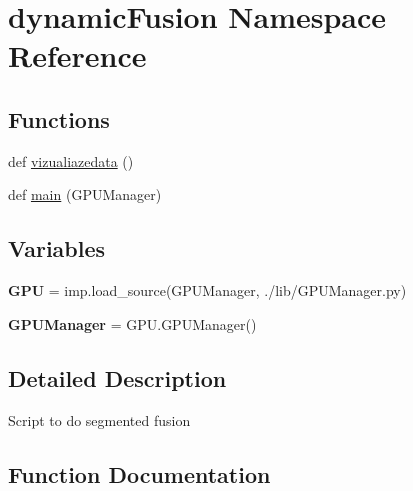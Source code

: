 \hypertarget{namespacedynamic_fusion}{}\section{dynamic\+Fusion Namespace Reference}
\label{namespacedynamic_fusion}
\subsection*{Functions}
\begin{DoxyCompactItemize}
\item 
def \hyperlink{namespacedynamic_fusion_a10b565077b2ce16f2ca380fb8b634fa1}{vizualiazedata} ()
\item 
def \hyperlink{namespacedynamic_fusion_a6ead22a2201158e6101fd1b1e89f3c27}{main} (G\+P\+U\+Manager)
\end{DoxyCompactItemize}
\subsection*{Variables}
\begin{DoxyCompactItemize}
\item 
\mbox{\label{namespacedynamic_fusion_a330708383ddc6854d2f4594339bf2eb9}} 
{\bfseries G\+PU} = imp.\+load\+\_\+source(\textquotesingle{}G\+P\+U\+Manager\textquotesingle{}, \textquotesingle{}./lib/G\+P\+U\+Manager.\+py\textquotesingle{})
\item 
\mbox{\label{namespacedynamic_fusion_a419f0f77f73819562fdfabdbd6bb2469}} 
{\bfseries G\+P\+U\+Manager} = G\+P\+U.\+G\+P\+U\+Manager()
\end{DoxyCompactItemize}


\subsection{Detailed Description}
\begin{DoxyVerb}Script to do segmented fusion\end{DoxyVerb}
 

\subsection{Function Documentation}
\mbox{\label{namespacedynamic_fusion_a6ead22a2201158e6101fd1b1e89f3c27}} 
